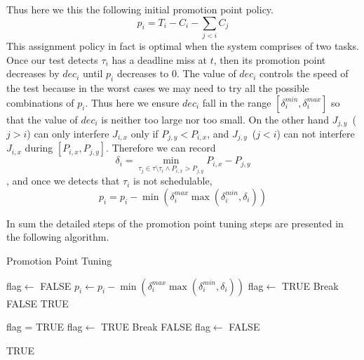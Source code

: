 Thus here we this the following initial promotion point policy.
\begin{equation}
p_i=T_i-C_i-\sum\limits_{j<i}C_j
\end{equation}
This assignment policy in fact is optimal when the system comprises of two tasks. Once our test detects $\tau_i$ has a deadline miss at $t$, then its promotion point decreases by $dec_i$ until $p_i$ decreases to $0$. The value of $dec_i$ controls the speed of the test because in the worst cases we may need to try all the possible combinations of $p_i$.  Thus here we ensure $dec_i$ fall in the range $[\delta_i^{min},\delta_i^{max}]$ so that the value of $dec_i$ is neither too large nor too small. On the other hand $J_{j,y}$~($j>i$) can only interfere $J_{i,x}$ only if $P_{j,y}<P_{i,x}$, and $J_{j,y}$~($j<i$) can not interfere $J_{i,x}$ during $[P_{i,x},P_{j,y}]$. Therefore we can record 
\[\delta_i=\min\limits_{\tau_j\in\tau\setminus \tau_i\wedge P_{i,x}>P_{j,y} }P_{i,x}-P_{j,y}\]
, and once we detects that $\tau_i$ is not schedulable, 
\[
p_i=p_i-\min\left(\delta_i^{max} \max\left(\delta_i^{min},\delta_i\right)\right)
\]

In sum the detailed steps of the promotion point tuning steps are presented in the following algorithm.
\begin{algorithm}
   \caption{Promotion Point Tuning}
    \begin{algorithmic}[1]
        \State flag$\leftarrow$ FALSE
			\State $p_i\leftarrow p_i-\min\left(\delta_i^{max} \max\left(\delta_i^{min},\delta_i\right)\right)$
			\State flag$\leftarrow$ TRUE
			\State Break
			\Else
			\State \Return FALSE
			\EndIf
		\EndIf
        \EndFor
		\EndWhile
		\State \Return TRUE
     
       \EndFunction
	  	\State flag = TRUE
						\State flag$\leftarrow$ TRUE
						\State Break
					\EndIf
				\EndFor
				\If {flag==FALSE}
					\Return FALSE
				\Else
					\State flag$\leftarrow$ FALSE
				\EndIf

			\EndFor
				\State \Return TRUE
		\EndFunction
\end{algorithmic}
\end{algorithm}


